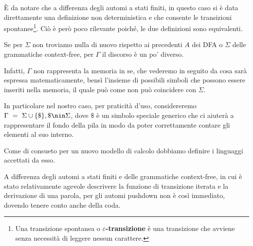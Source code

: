 
È da notare che a differenza degli automi a stati finiti, in questo caso si è data direttamente una definizione non deterministica e che consente le transizioni spontanee\footnote{Una transizione spontanea o \textbf{$\varepsilon$-transizione} è una transizione che avviene senza necessità di leggere nessun carattere.}. Ciò è però poco rilevante poiché, le due definizioni sono equivalenti.

Se per $\Sigma$ non troviamo nulla di nuovo rispetto ai precedenti $A$  dei DFA o $\Sigma$ delle grammatiche context-free, per $\Gamma$ il discorso è un po' diverso.

Infatti, $\Gamma$ non rappresenta la memoria in se, che vederemo in seguito da cosa sarà espressa matematicamente, bensì l'insieme di possibili simboli che possono essere inseriti nella memoria, il quale può come non può coincidere con $\Sigma$.

In particolare nel nostro caso, per praticità d'uso, considereremo $\Gamma\ =\ \Sigma \cup \cbrakets{\$}, \$ \nin \Sigma$, dove $\$$ è un simbolo speciale generico che ci aiuterà a rappresentare il fondo della pila in modo da poter correttamente contare gli elementi al suo interno.

Come di consueto per un nuovo modello di calcolo dobbiamo definire i linguaggi accettati da esso.

A differenza degli automi a stati finiti e delle grammatiche context-free, in cui è stato relativamente agevole descrivere la funzione di transizione iterata e la derivazione di una parola, per gli automi pushdown non è così immediato, dovendo tenere conto anche della coda.

